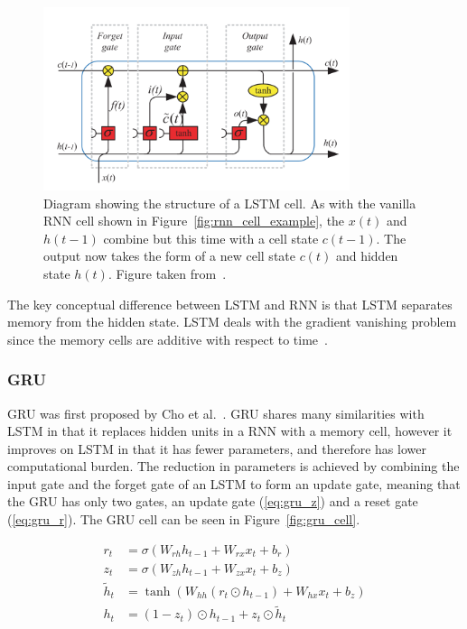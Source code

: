 \begin{figure}[ht]
  \centering
  \includegraphics[width=0.8\textwidth]{figures/lstm_cell.png}
  \caption{Diagram showing the structure of a LSTM cell. As with the vanilla RNN
    cell shown in Figure~\ref{fig:rnn_cell_example}, the $x(t)$ and $h(t-1)$
    combine but this time with a cell state $c(t-1)$. The output now takes the
    form of a new cell state $c(t)$ and hidden state $h(t)$. Figure taken
  from~\cite{yu2019review}.}\label{fig:lstm_cell_example}
\end{figure}

The key conceptual difference between LSTM and RNN is that LSTM separates memory
from the hidden state. LSTM deals with the gradient vanishing problem since the
memory cells are additive with respect to time~\cite{daniluk2004automatic}. 

\subsubsection{GRU}

GRU was first proposed by Cho et al.~\cite{cho2014properties}. GRU shares many
similarities with LSTM in that it replaces hidden units in a RNN with a memory
cell, however it improves on LSTM in that it has fewer parameters, and therefore
has lower computational burden. The reduction in parameters is achieved by
combining the input gate and the forget gate of an LSTM to form an update gate,
meaning that the GRU has only two gates, an update gate (\ref{eq:gru_z}) and a
reset gate (\ref{eq:gru_r}). The GRU cell can be seen in
Figure~\ref{fig:gru_cell}.

\begin{align}
  r_t &= \sigma\left( W_{rh}h_{t-1} + W_{rx}x_t + b_r \right) \label{eq:gru_r} \\[0.5em]
  z_t &= \sigma\left( W_{zh}h_{t-1} + W_{zx}x_t + b_z \right) \label{eq:gru_z} \\[0.5em]
  \tilde{h}_t &= \tanh\left( W_{hh}(r_t \odot h_{t-1}) + W_{hx}x_t + b_z \right) \\[0.5em]
  h_t &= (1-z_t) \odot h_{t-1} + z_t \odot \tilde{h}_t
\end{align}

